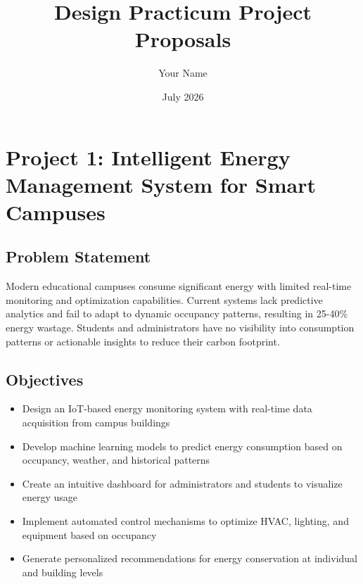 \documentclass[12pt,a4paper]{article}
\title{\textbf{Design Practicum Project Proposals}}
\author{Your Name}
\date{July 2026}
\begin{document}
\maketitle

\tableofcontents
\newpage

\section{Project 1: Intelligent Energy Management System for Smart Campuses}

\subsection{Problem Statement}
Modern educational campuses consume significant energy with limited real-time monitoring and optimization capabilities. Current systems lack predictive analytics and fail to adapt to dynamic occupancy patterns, resulting in 25-40\% energy wastage. Students and administrators have no visibility into consumption patterns or actionable insights to reduce their carbon footprint.

\subsection{Objectives}
\begin{itemize}[leftmargin=*]
    \item Design an IoT-based energy monitoring system with real-time data acquisition from campus buildings
    \item Develop machine learning models to predict energy consumption based on occupancy, weather, and historical patterns
    \item Create an intuitive dashboard for administrators and students to visualize energy usage
    \item Implement automated control mechanisms to optimize HVAC, lighting, and equipment based on occupancy
    \item Generate personalized recommendations for energy conservation at individual and building levels
\end{itemize}
\end{document}
